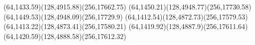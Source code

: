 {(64,1433.59)(128,4915.88)(256,17662.75)}
{(64,1450.21)(128,4948.77)(256,17730.58)}
{(64,1449.53)(128,4948.09)(256,17729.9)}
{(64,1412.54)(128,4872.73)(256,17579.53)}
{(64,1413.22)(128,4873.41)(256,17580.21)}
{(64,1419.92)(128,4887.9)(256,17611.64)}
{(64,1420.59)(128,4888.58)(256,17612.32)}
